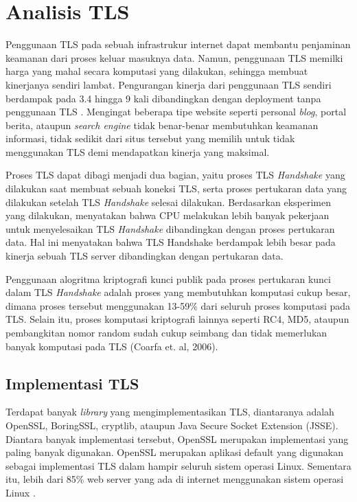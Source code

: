 
\section{Analisis TLS}
  Penggunaan TLS pada sebuah infrastrukur internet dapat membantu penjaminan keamanan dari proses keluar masuknya data. Namun, penggunaan TLS memilki harga yang mahal secara komputasi yang dilakukan, sehingga membuat kinerjanya sendiri lambat. Pengurangan kinerja dari penggunaan TLS sendiri berdampak pada 3.4 hingga 9 kali dibandingkan dengan deployment tanpa penggunaan TLS \citep{perf_tls}. Mengingat beberapa tipe website seperti personal \textit{blog}, portal berita, ataupun \textit{search engine} tidak benar-benar membutuhkan keamanan informasi, tidak sedikit dari situs tersebut yang memilih untuk tidak menggunakan TLS demi mendapatkan kinerja yang maksimal.


  Proses TLS dapat dibagi menjadi dua bagian, yaitu proses TLS \textit{Handshake} yang dilakukan saat membuat sebuah koneksi TLS, serta proses pertukaran data yang dilakukan setelah TLS \textit{Handshake} selesai dilakukan. Berdasarkan eksperimen yang dilakukan, \cite{perf_tls} menyatakan bahwa CPU melakukan lebih banyak pekerjaan untuk menyelesaikan TLS \textit{Handshake} dibandingkan dengan proses pertukaran data. Hal ini menyatakan bahwa TLS Handshake berdampak lebih besar pada kinerja sebuah TLS server dibandingkan dengan pertukaran data.

  Penggunaan alogritma kriptografi kunci publik pada proses pertukaran kunci  dalam TLS \textit{Handshake} adalah proses yang membutuhkan komputasi cukup besar, dimana proses tersebut menggunakan 13-59\% dari seluruh proses komputasi pada TLS. Selain itu, proses komputasi kriptografi lainnya seperti RC4, MD5, ataupun pembangkitan nomor random sudah cukup seimbang dan tidak memerlukan banyak komputasi pada TLS (Coarfa et. al, 2006).

  \subsection{Implementasi TLS}
    Terdapat banyak \textit{library} yang mengimplementasikan TLS, diantaranya adalah OpenSSL, BoringSSL, cryptlib, ataupun Java Secure Socket Extension (JSSE). Diantara banyak implementasi tersebut, OpenSSL merupakan implementasi yang paling banyak digunakan. OpenSSL merupakan aplikasi default yang digunakan sebagai implementasi TLS dalam hampir seluruh sistem operasi Linux. Sementara itu, lebih dari 85\% web server yang ada di internet menggunakan sistem operasi Linux \citep{server_os_marketshare}.

